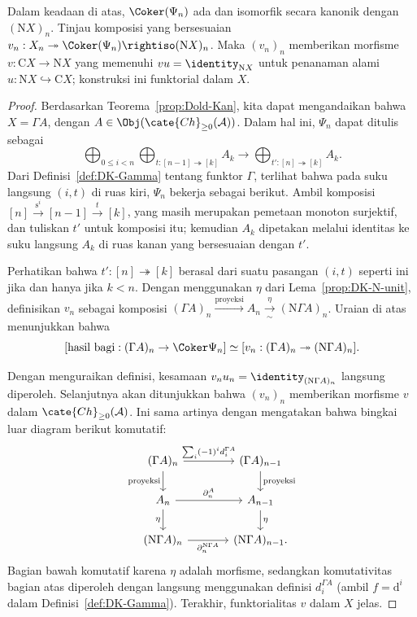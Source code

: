 \begin{proposition}\label{prop:Dold-Kan-v}
	Dalam keadaan di atas, $\Coker(\Psi_n)$ ada dan isomorfik secara kanonik
	dengan $(\mathrm{N}X)_n$. Tinjau komposisi yang bersesuaian
	$v_n:X_n\twoheadrightarrow\Coker(\Psi_n)\rightiso(\mathrm{N}X)_n$.
	Maka $(v_n)_n$ memberikan morfisme
	$v:\mathrm{C}X\to\mathrm{N}X$ yang memenuhi
	$vu=\identity_{\mathrm{N}X}$ untuk penanaman alami
	$u:\mathrm{N}X\hookrightarrow\mathrm{C}X$; konstruksi ini funktorial dalam $X$.
\end{proposition}
\begin{proof}
	Berdasarkan Teorema~\ref{prop:Dold-Kan}, kita dapat mengandaikan bahwa
	$X=\Gamma A$, dengan
	$A\in\Obj(\cate{Ch}_{\geq0}(\mathcal{A}))$. Dalam hal ini, $\Psi_n$
	dapat ditulis sebagai
	\[ \bigoplus_{0 \leq i < n} \bigoplus_{t: [n-1] \twoheadrightarrow [k]} A_k \to \bigoplus_{t': [n] \twoheadrightarrow [k] } A_k. \]
	Dari Definisi~\ref{def:DK-Gamma} tentang funktor $\Gamma$, terlihat bahwa
	pada suku langsung $(i,t)$ di ruas kiri, $\Psi_n$ bekerja sebagai berikut.
	Ambil komposisi
	$[n]\xrightarrow{\mathrm{s}^i}[n-1]\xrightarrow{t}[k]$, yang masih
	merupakan pemetaan monoton surjektif, dan tuliskan $t'$ untuk komposisi itu;
	kemudian $A_k$ dipetakan melalui identitas ke suku langsung $A_k$ di ruas kanan
	yang bersesuaian dengan $t'$.

	Perhatikan bahwa $t':[n]\twoheadrightarrow[k]$ berasal dari suatu pasangan
	$(i,t)$ seperti ini jika dan hanya jika $k<n$. Dengan menggunakan $\eta$
	dari Lema~\ref{prop:DK-N-unit}, definisikan $v_n$ sebagai komposisi
	$(\Gamma A)_n\xrightarrow{\text{proyeksi}}A_n
	\xrightarrow[\sim]{\eta}(\mathrm{N}\Gamma A)_n$. Uraian di atas
	menunjukkan bahwa
	\[ [\text{hasil bagi}: (\Gamma A)_n \to \Coker \Psi_n] \simeq [v_n: (\Gamma A)_n \twoheadrightarrow (\mathrm{N}\Gamma A)_n ] . \]

	Dengan menguraikan definisi, kesamaan
	$v_nu_n=\identity_{(\mathrm{N}\Gamma A)_n}$ langsung diperoleh.
	Selanjutnya akan ditunjukkan bahwa $(v_n)_n$ memberikan morfisme $v$ dalam
	$\cate{Ch}_{\geq0}(\mathcal{A})$. Ini sama artinya dengan mengatakan bahwa
	bingkai luar diagram berikut komutatif:
	\[\begin{tikzcd}[column sep=large]
		(\Gamma A)_n \arrow[r, "{\sum_i (-1)^i d^{\Gamma A}_i}"] \arrow[d, "\text{proyeksi}"'] & (\Gamma A)_{n-1} \arrow[d, "\text{proyeksi}"] \\
		A_n \arrow[r, "{\partial^A_n}"] \arrow[d, "\eta"'] & A_{n-1} \arrow[d, "\eta"] \\
		(\mathrm{N}\Gamma A)_n \arrow[r, "{\partial^{\mathrm{N}\Gamma A}_n}"'] & (\mathrm{N}\Gamma A)_{n-1}.
	\end{tikzcd}\]
	Bagian bawah komutatif karena $\eta$ adalah morfisme, sedangkan
	komutativitas bagian atas diperoleh dengan langsung menggunakan definisi
	$d_i^{\Gamma A}$ (ambil $f=\mathrm{d}^i$ dalam
	Definisi~\ref{def:DK-Gamma}). Terakhir, funktorialitas $v$ dalam $X$ jelas.
\end{proof}

